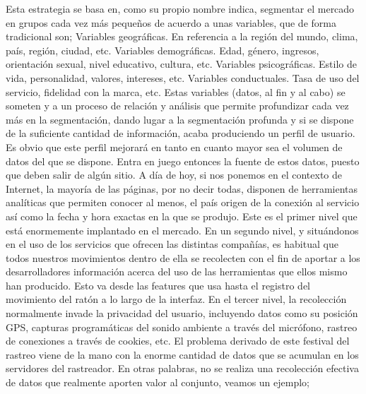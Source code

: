 \documentclass[12pt,a4paper,oneside]{book} %
\begin{document}
\newline \newline
Esta estrategia se basa en, como su propio nombre indica, segmentar el mercado en grupos cada vez más pequeños de acuerdo a unas variables, que de forma tradicional son; 
Variables geográficas. En referencia a la región del mundo, clima, país, región, ciudad, etc. 
Variables demográficas. Edad, género, ingresos, orientación sexual, nivel educativo, cultura, etc. 
Variables psicográficas. Estilo de vida, personalidad, valores, intereses, etc. 
Variables conductuales. Tasa de uso del servicio, fidelidad con la marca, etc. 
\newline \newline
Estas variables (datos, al fin y al cabo) se someten y a un proceso de relación y análisis que permite profundizar cada vez más en la segmentación, dando lugar a la segmentación profunda y si se dispone de la suficiente cantidad de información, acaba produciendo un perfil de usuario. Es obvio que este perfil mejorará en tanto en cuanto mayor sea el volumen de datos del que se dispone. 
\newline \newline
Entra en juego entonces la fuente de estos datos, puesto que deben salir de algún sitio. A día de hoy, si nos ponemos en el contexto de Internet, la mayoría de las páginas, por no decir todas, disponen de herramientas analíticas que permiten conocer al menos, el país origen de la conexión al servicio así como la fecha y hora exactas en la que se produjo. Este es el primer nivel que está enormemente implantado en el mercado. 
\newline \newline
En un segundo nivel, y situándonos en el uso de los servicios que ofrecen las distintas compañías, es habitual que todos nuestros movimientos dentro de ella se recolecten con el fin de aportar a los desarrolladores información acerca del uso de las herramientas que ellos mismo han producido. Esto va desde las features que usa hasta el registro del movimiento del ratón a lo largo de la interfaz. 
\newline \newline
En el tercer nivel, la recolección normalmente invade la privacidad del usuario, incluyendo datos como su posición GPS, capturas programáticas del sonido ambiente a través del micrófono, rastreo de conexiones a través de cookies, etc. 
\newline \newline
El problema derivado de este festival del rastreo viene de la mano con la enorme cantidad de datos que se acumulan en los servidores del rastreador. En otras palabras, no se realiza una recolección efectiva de datos que realmente aporten valor al conjunto, veamos un ejemplo; 
\end{document}
